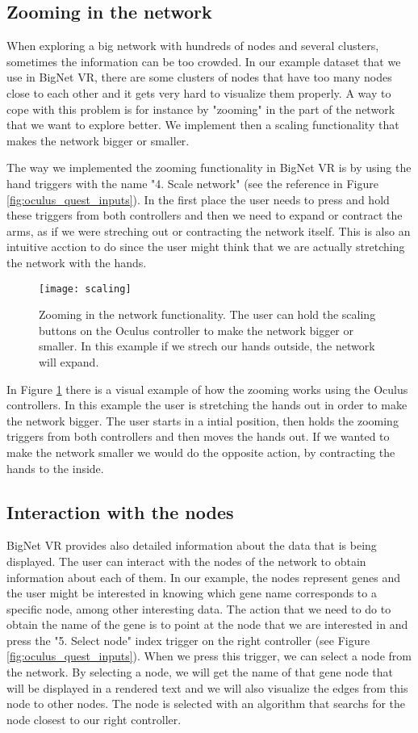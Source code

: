 \subsection{Zooming in the network}
When exploring a big network with hundreds of nodes and several clusters, sometimes the information can be too crowded. In our example dataset that we use in BigNet VR, there are some clusters of nodes that have too many nodes close to each other and it gets very hard to visualize them properly. A way to cope with this problem is for instance by "zooming" in the part of the network that we want to explore better. We implement then a scaling functionality that makes the network bigger or smaller.

The way we implemented the zooming functionality in BigNet VR is by using the hand triggers with the name "4. Scale network" (see the reference in Figure \ref{fig:oculus_quest_inputs}). In the first place the user needs to press and hold these triggers from both controllers and then we need to expand or contract the arms, as if we were streching out or contracting the network itself. This is also an intuitive acction to do since the user might think that we are actually stretching the network with the hands.

\begin{figure}[h!]
    \centering%
    \texttt{[image: scaling]}
    \caption{Zooming in the network functionality. The user can hold the scaling buttons on the Oculus controller to make the network bigger or smaller. In this example if we strech our hands outside, the network will expand.}
    \label{fig:scaling}
\end{figure}%


In Figure \ref{fig:scaling} there is a visual example of how the zooming works using the Oculus controllers. In this example the user is stretching the hands out in order to make the network bigger. The user starts in a intial position, then holds the zooming triggers from both controllers and then moves the hands out. If we wanted to make the network smaller we would do the opposite action, by contracting the hands to the inside.

\subsection{Interaction with the nodes}
BigNet VR provides also detailed information about the data that is being displayed. The user can interact with the nodes of the network to obtain information about each of them. In our example, the nodes represent genes and the user might be interested in knowing which gene name corresponds to a specific node, among other interesting data. The action that we need to do to obtain the name of the gene is to point at the node that we are interested in and press the "5. Select node" index trigger on the right controller (see Figure \ref{fig:oculus_quest_inputs}). When we press this trigger, we can select a node from the network. By selecting a node, we will get the name of that gene node that will be displayed in a rendered text and we will also visualize the edges from this node to other nodes. The node is selected with an algorithm that searchs for the node closest to our right controller.

